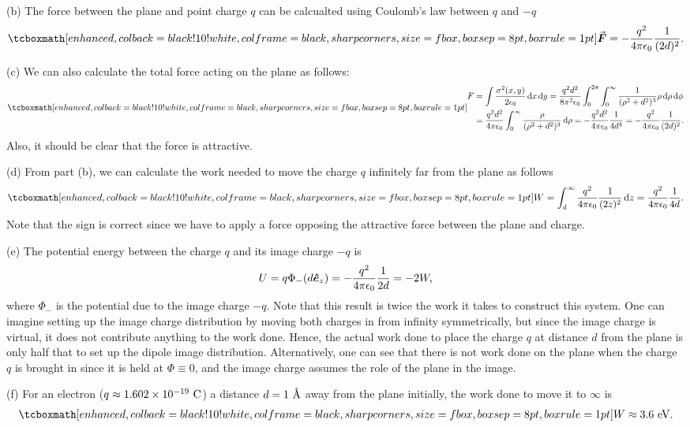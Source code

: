 {(b) The force between the plane and point charge $q$ can be calcualted using Coulomb's law between $q$ and $-q$
\begin{eqnarray}
    \eqbox{ \va*{F} = - \frac{q^2}{4 \pi \epsilon_0} \frac{1}{(2d)^2} }
.\end{eqnarray}

(c) We can also calculate the total force acting on the plane as follows:
\begin{eqnarray}
    \eqbox{
   \begin{aligned}
       F &= \int \frac{\sigma^2(x,y)}{2 \epsilon_0} \dd{x} \dd{y} = \frac{q^2 d^2}{8 \pi^2 \epsilon_0} \int_{0}^{2 \pi} \int_{0}^{\infty} \frac{1}{(\rho^2 + d^2)^3} \rho \dd{\rho} \dd{\phi} \\
         &= \frac{q^2 d^2}{4 \pi \epsilon_0} \int_{0}^{\infty} \frac{\rho}{(\rho^2 + d^2)^3} \dd{\rho} = -\frac{q^2 d^2}{4 \pi \epsilon_0} \frac{1}{4 d^{4}} = -\frac{q^2}{4 \pi \epsilon_0} \frac{1}{(2d)^2}
   .\end{aligned} 
}
\end{eqnarray}
Also, it should be clear that the force is attractive.

(d) From part (b), we can calculate the work needed to move the charge $q$ infinitely far from the plane as follows
\begin{eqnarray}
    \eqbox{ W = \int_{d}^{\infty} \frac{q^2}{4 \pi \epsilon_0} \frac{1}{(2 z)^2} \dd{z} = \frac{q^2}{4 \pi \epsilon_0} \frac{1}{4 d} }
.\end{eqnarray}
Note that the sign is correct since we have to apply a force opposing the attractive force between the plane and charge.

(e) The potential energy between the charge $q$ and its image charge $-q$ is 
\begin{eqnarray}
    U = q \Phi_{-}(d \vu*{e}_{z}) = - \frac{q^2}{4 \pi \epsilon_0} \frac{1}{2 d} = -2 W
,\end{eqnarray}
where $\Phi_{-}$ is the potential due to the image charge $-q$.
Note that this result is twice the work it takes to construct this system.
One can imagine setting up the image charge distribution by moving both charges in from infinity symmetrically, but since the image charge is virtual, it does not contribute anything to the work done.
Hence, the actual work done to place the charge $q$ at distance $d$ from the plane is only half that to set up the dipole image distribution.
Alternatively, one can see that there is not work done on the plane when the charge $q$ is brought in since it is held at $\Phi \equiv 0$, and the image charge assumes the role of the plane in the image.

(f) For an electron ($q \approx 1.602 \times 10^{-19}~{\rm C}$) a distance $d = 1~{\textrm{\r{A}}}$ away from the plane initially, the work done to move it to $\infty$ is
\begin{eqnarray}
    \eqbox{ W \approx 3.6~{\rm eV} }
.\end{eqnarray}


}


